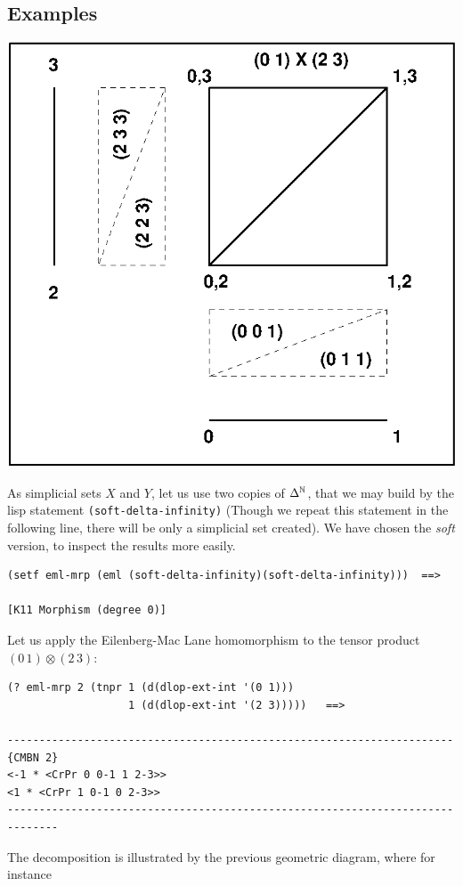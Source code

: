 \subsection* {Examples}
%
\vskip 0.40cm
\centerline{\includegraphics{eml1.eps}}
\vskip 0.40cm
%
As simplicial sets $X$ and $Y$, let us use two copies of $\Delta^{{\Bbb N}}$, that we may build
by the lisp statement {\tt (soft-delta-infinity)} (Though we repeat this statement
in the following line, there will be only a simplicial set created). We have chosen the {\em soft}
version, to inspect  the results more easily. 
{\footnotesize\begin{verbatim} 
(setf eml-mrp (eml (soft-delta-infinity)(soft-delta-infinity)))  ==>

[K11 Morphism (degree 0)]
\end{verbatim}}
Let us apply the Eilenberg-Mac Lane homomorphism to the tensor product
$(0\, 1)\otimes (2\, 3)$:
{\footnotesize\begin{verbatim} 
(? eml-mrp 2 (tnpr 1 (d(dlop-ext-int '(0 1)))
                   1 (d(dlop-ext-int '(2 3)))))   ==>

----------------------------------------------------------------------{CMBN 2}
<-1 * <CrPr 0 0-1 1 2-3>>
<1 * <CrPr 1 0-1 0 2-3>>
------------------------------------------------------------------------------
\end{verbatim}}
\newpage
The decomposition is illustrated by the previous geometric diagram, where for instance

